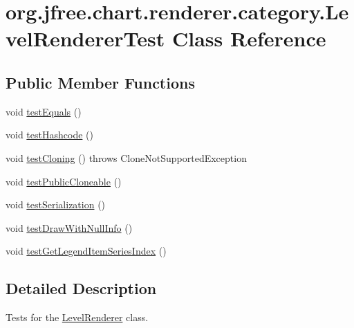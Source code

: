 \hypertarget{classorg_1_1jfree_1_1chart_1_1renderer_1_1category_1_1_level_renderer_test}{}\section{org.\+jfree.\+chart.\+renderer.\+category.\+Level\+Renderer\+Test Class Reference}
\label{classorg_1_1jfree_1_1chart_1_1renderer_1_1category_1_1_level_renderer_test}
\subsection*{Public Member Functions}
\begin{DoxyCompactItemize}
\item 
void \mbox{\hyperlink{classorg_1_1jfree_1_1chart_1_1renderer_1_1category_1_1_level_renderer_test_ae1eab2f5d8f0d677909fcb37984e1bbe}{test\+Equals}} ()
\item 
void \mbox{\hyperlink{classorg_1_1jfree_1_1chart_1_1renderer_1_1category_1_1_level_renderer_test_a95c98ff330188f57c0224b277a7a4653}{test\+Hashcode}} ()
\item 
void \mbox{\hyperlink{classorg_1_1jfree_1_1chart_1_1renderer_1_1category_1_1_level_renderer_test_adc9c4cb2e77fe2e93e688bcf25adf751}{test\+Cloning}} ()  throws Clone\+Not\+Supported\+Exception 
\item 
void \mbox{\hyperlink{classorg_1_1jfree_1_1chart_1_1renderer_1_1category_1_1_level_renderer_test_a54e6f81f51de37dc1bedc2336b105877}{test\+Public\+Cloneable}} ()
\item 
void \mbox{\hyperlink{classorg_1_1jfree_1_1chart_1_1renderer_1_1category_1_1_level_renderer_test_ac1c251e335c1f76397d8a5e7591b3008}{test\+Serialization}} ()
\item 
void \mbox{\hyperlink{classorg_1_1jfree_1_1chart_1_1renderer_1_1category_1_1_level_renderer_test_ae98f4465509244eebbe20a4820599ed3}{test\+Draw\+With\+Null\+Info}} ()
\item 
void \mbox{\hyperlink{classorg_1_1jfree_1_1chart_1_1renderer_1_1category_1_1_level_renderer_test_ac7e9a2846166875f754f1aeda1111b14}{test\+Get\+Legend\+Item\+Series\+Index}} ()
\end{DoxyCompactItemize}


\subsection{Detailed Description}
Tests for the \mbox{\hyperlink{classorg_1_1jfree_1_1chart_1_1renderer_1_1category_1_1_level_renderer}{Level\+Renderer}} class. 

